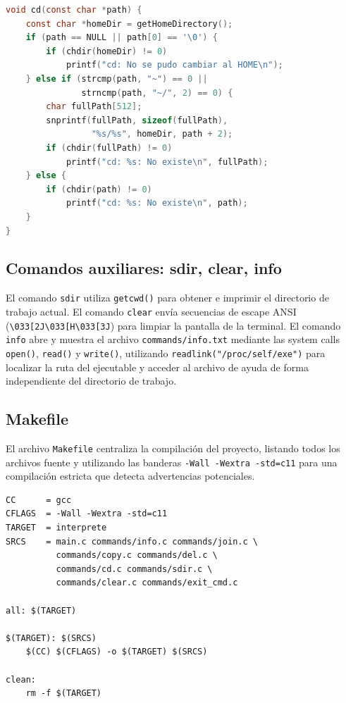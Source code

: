         \begin{lstlisting}[language=C, caption={Comando cd - Cambio de directorio}]
void cd(const char *path) {
    const char *homeDir = getHomeDirectory();
    if (path == NULL || path[0] == '\0') {
        if (chdir(homeDir) != 0)
            printf("cd: No se pudo cambiar al HOME\n");
    } else if (strcmp(path, "~") == 0 ||
               strncmp(path, "~/", 2) == 0) {
        char fullPath[512];
        snprintf(fullPath, sizeof(fullPath),
                 "%s/%s", homeDir, path + 2);
        if (chdir(fullPath) != 0)
            printf("cd: %s: No existe\n", fullPath);
    } else {
        if (chdir(path) != 0)
            printf("cd: %s: No existe\n", path);
    }
}
        \end{lstlisting}

    \subsection{Comandos auxiliares: sdir, clear, info}
        El comando \texttt{sdir} utiliza \texttt{getcwd()} para obtener e imprimir el directorio de trabajo actual. El comando \texttt{clear} envía secuencias de escape ANSI (\texttt{\textbackslash 033[2J\textbackslash 033[H\textbackslash 033[3J}) para limpiar la pantalla de la terminal. El comando \texttt{info} abre y muestra el archivo \texttt{commands/info.txt} mediante las system calls \texttt{open()}, \texttt{read()} y \texttt{write()}, utilizando \texttt{readlink("/proc/self/exe")} para localizar la ruta del ejecutable y acceder al archivo de ayuda de forma independiente del directorio de trabajo.

    \subsection{Makefile}
        El archivo \texttt{Makefile} centraliza la compilación del proyecto, listando todos los archivos fuente y utilizando las banderas \texttt{-Wall -Wextra -std=c11} para una compilación estricta que detecta advertencias potenciales.

        \begin{verbatim}
CC      = gcc
CFLAGS  = -Wall -Wextra -std=c11
TARGET  = interprete
SRCS    = main.c commands/info.c commands/join.c \
          commands/copy.c commands/del.c \
          commands/cd.c commands/sdir.c \
          commands/clear.c commands/exit_cmd.c

all: $(TARGET)

$(TARGET): $(SRCS)
	$(CC) $(CFLAGS) -o $(TARGET) $(SRCS)

clean:
	rm -f $(TARGET)
        \end{verbatim}


